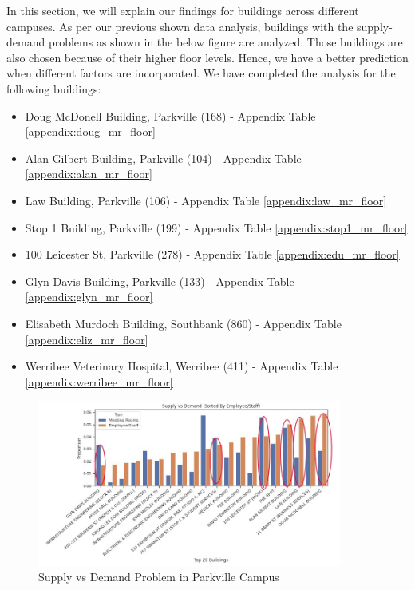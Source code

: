 In this section, we will explain our findings for buildings across different campuses. As per our previous shown data analysis, buildings with the supply-demand problems as shown in the below figure are analyzed. Those buildings are also chosen because of their higher floor levels. Hence, we have a better prediction when different factors are incorporated. We have completed the analysis for the following buildings:

\begin{itemize}
    \item Doug McDonell Building, Parkville (168)  - Appendix Table \ref{appendix:doug_mr_floor}
    \item Alan Gilbert Building, Parkville (104) - Appendix Table \ref{appendix:alan_mr_floor}
    \item Law Building, Parkville (106) - Appendix Table \ref{appendix:law_mr_floor}
    \item Stop 1 Building, Parkville (199) - Appendix Table \ref{appendix:stop1_mr_floor}
    \item 100 Leicester St, Parkville (278) - Appendix Table \ref{appendix:edu_mr_floor}
    \item Glyn Davis Building, Parkville (133) - Appendix Table \ref{appendix:glyn_mr_floor}
    \item Elisabeth Murdoch Building, Southbank (860) - Appendix Table \ref{appendix:eliz_mr_floor}
    \item Werribee Veterinary Hospital, Werribee (411) - Appendix Table \ref{appendix:werribee_mr_floor}
\end{itemize}

\begin{figure}[H]
\centering
\includegraphics[width=10cm,keepaspectratio=true]{content/results/floors/plots/Building.png}
\caption{Supply vs Demand Problem in Parkville Campus}
\label{fig:Building}
\end{figure}


